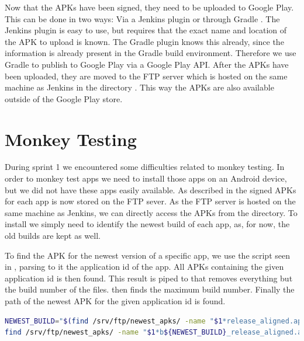 Now that the APKs have been signed, they need to be uploaded to Google Play. This can be done in two ways: Via a Jenkins plugin \parencite{jenkins-play-plugin} or through Gradle \parencite{gradle-play-plugin}. The Jenkins plugin is easy to use, but requires that the exact name and location of the APK to upload is known. The Gradle plugin knows this already, since the information is already present in the Gradle build environment. Therefore we use Gradle to publish to Google Play via a Google Play API\@. After the APKs have been uploaded, they are moved to the FTP server which is hosted on the same machine as Jenkins in the directory . This way the APKs are also available outside of the Google Play store.

\section{Monkey Testing}\label{sec:monkey_testing_s2}
During sprint 1 we encountered some difficulties related to monkey testing. In order to monkey test apps we need to install those apps on an Android device, but we did not have these apps easily available. As described in  the signed APKs for each app is now stored on the FTP sever. As the FTP server is hosted on the same machine as Jenkins, we can directly access the APKs from the directory. To install we simply need to identify the newest build of each app, as, for now, the old builds are kept as well.

To find the APK for the newest version of a specific app, we use the script seen in , parsing to it the application id of the app. All APKs containing the given application id is then found. This result is piped to  that removes everything but the build number of the files.  \parencite{stackoverflow-max-number2012} then finds the maximum build number. Finally the path of the newest APK for the given application id is found.

\begin{lstlisting}[language=bash,showstringspaces=false,caption=Script that finds the newest APK for a particular application id,label=lst:find_newest_apk]
NEWEST_BUILD="$(find /srv/ftp/newest_apks/ -name "$1*release_aligned.apk" | sed 's/.*b//' | sed 's/_release_aligned.apk//' | awk '$0>x{x=$0};END{print x}')"
find /srv/ftp/newest_apks/ -name "$1*b${NEWEST_BUILD}_release_aligned.apk"
\end{lstlisting}


